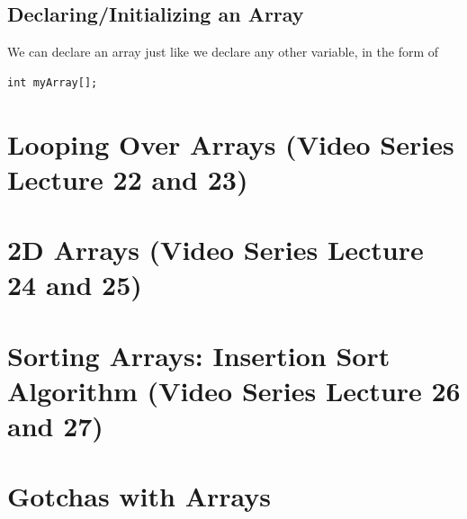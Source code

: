 \documentclass[11]{article}
\begin{document}
\subsection{Declaring/Initializing an Array}
We can declare an array just like we declare any other variable, in the form of
\begin{lstlisting}
int myArray[];
\end{lstlisting}

\section{Looping Over Arrays (Video Series Lecture 22 and 23)}
\section{2D Arrays (Video Series Lecture 24 and 25)}
\section{Sorting Arrays: Insertion Sort Algorithm (Video Series Lecture 26 and 27)}
\section{Gotchas with Arrays}
\end{document}
